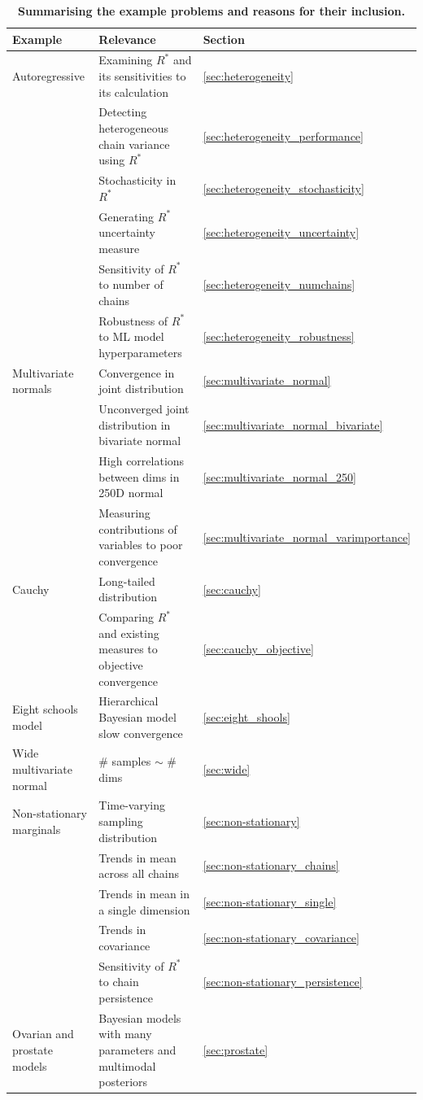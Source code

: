 \documentclass{article}
\begin{document}
\begin{table}[]
	\begin{tabular}{l|l|l}
		Example &  Relevance & Section \\
		\midrule
		Autoregressive & Examining $R^*$ and its sensitivities to its calculation & \ref{sec:heterogeneity} \\
		& Detecting heterogeneous chain variance using $R^*$ & \ref{sec:heterogeneity_performance} \\
		& Stochasticity in $R^*$ & \ref{sec:heterogeneity_stochasticity}\\
		& Generating $R^*$ uncertainty measure & \ref{sec:heterogeneity_uncertainty}\\
		& Sensitivity of $R^*$ to number of chains & \ref{sec:heterogeneity_numchains}\\
		& Robustness of $R^*$ to ML model hyperparameters & \ref{sec:heterogeneity_robustness}\\
		\midrule
		Multivariate normals & Convergence in joint distribution &  \ref{sec:multivariate_normal}\\
		& Unconverged joint distribution in bivariate normal & \ref{sec:multivariate_normal_bivariate}\\
		& High correlations between dims in 250D normal  & \ref{sec:multivariate_normal_250}\\
		& Measuring contributions of variables to poor convergence & \ref{sec:multivariate_normal_varimportance}\\
		\midrule
		Cauchy & Long-tailed distribution & \ref{sec:cauchy}\\
		& Comparing $R^*$ and existing measures to objective convergence & \ref{sec:cauchy_objective}\\
		\midrule
		Eight schools model & Hierarchical Bayesian model slow convergence & \ref{sec:eight_shools}\\
		\midrule 
		Wide multivariate normal & \# samples $\sim$ \# dims & \ref{sec:wide}\\
		\midrule
		Non-stationary marginals & Time-varying sampling distribution & \ref{sec:non-stationary}\\
		& Trends in mean across all chains & \ref{sec:non-stationary_chains}\\
		& Trends in mean in a single dimension & \ref{sec:non-stationary_single}\\
		& Trends in covariance & \ref{sec:non-stationary_covariance}\\
		& Sensitivity of $R^*$ to chain persistence & \ref{sec:non-stationary_persistence}\\
		\midrule
		Ovarian and prostate models & Bayesian models with many parameters and multimodal posteriors & \ref{sec:prostate}\\
	\end{tabular}\caption{\textbf{Summarising the example problems and reasons for their inclusion.}}\label{tab:results}
\end{table}
\end{document}
